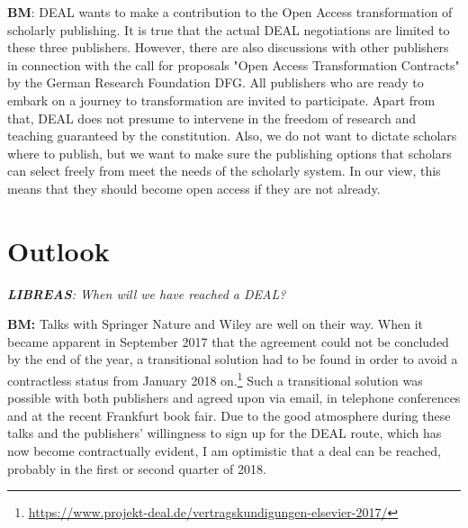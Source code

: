 \documentclass[a4paper,
fontsize=11pt,
oneside,
numbers=noperiodatend,
parskip=half-,
bibliography=totoc,
final
]{scrartcl}
\begin{document}
\textbf{BM}: DEAL wants to make a contribution to the Open Access
transformation of scholarly publishing. It is true that the actual DEAL
negotiations are limited to these three publishers. However, there are
also discussions with other publishers in connection with the call for
proposals "Open Access Transformation Contracts" by the German Research
Foundation DFG. All publishers who are ready to embark on a journey to
transformation are invited to participate. Apart from that, DEAL does
not presume to intervene in the freedom of research and teaching
guaranteed by the constitution. Also, we do not want to dictate scholars
where to publish, but we want to make sure the publishing options that
scholars can select freely from meet the needs of the scholarly system.
In our view, this means that they should become open access if they are
not already.

\hypertarget{outlook}{%
\section*{Outlook}\label{outlook}}

\emph{\textbf{LIBREAS}: When will we have reached a DEAL?}

\textbf{BM:} Talks with Springer Nature and Wiley are well on their way.
When it became apparent in September 2017 that the agreement could not
be concluded by the end of the year, a transitional solution had to be
found in order to avoid a contractless status from January 2018
on.\footnote{\url{https://www.projekt-deal.de/vertragskundigungen-elsevier-2017/}}
Such a transitional solution was possible with both publishers and
agreed upon via email, in telephone conferences and at the recent
Frankfurt book fair. Due to the good atmosphere during these talks and
the publishers' willingness to sign up for the DEAL route, which has now
become contractually evident, I am optimistic that a deal can be
reached, probably in the first or second quarter of 2018.
\end{document}
